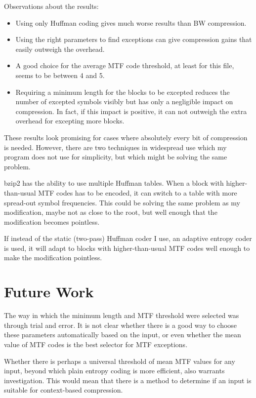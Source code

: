 \documentclass[a4paper]{scrreprt}
\begin{document}
Observations about the results:

\begin{itemize}
  \item Using only Huffman coding gives much worse results than BW compression.
  \item Using the right parameters to find exceptions can give compression gains
  that easily outweigh the overhead.
  \item A good choice for the average MTF code threshold, at least for this
  file, seems to be between 4 and 5.
  \item Requiring a minimum length for the blocks to be excepted reduces the
  number of excepted symbols visibly but has only a negligible impact on
  compression. In fact, if this impact is positive, it can not outweigh the
  extra overhead for excepting more blocks.
\end{itemize}

These results look promising for cases where absolutely every bit of compression
is needed. However, there are two techniques in widespread use which my program
does not use for simplicity, but which might be solving the same problem.

bzip2 has the ability to use multiple Huffman tables. When a block with
higher-than-usual MTF codes has to be encoded, it can switch to a table with
more spread-out symbol frequencies. This could be solving the same problem as my
modification, maybe not as close to the root, but well enough that the
modification becomes pointless.

If instead of the static (two-pass) Huffman coder I use, an adaptive entropy
coder is used, it will adapt to blocks with higher-than-usual MTF codes well
enough to make the modification pointless.
\section{Future Work}

The way in which the minimum length and MTF threshold were selected was through
trial and error. It is not clear whether there is a good way to choose these
parameters automatically based on the input, or even whether the mean value of
MTF codes is the best selector for MTF exceptions.

Whether there is perhaps a universal threshold of mean MTF values for any input,
beyond which plain entropy coding is more efficient, also warrants
investigation. This would mean that there is a method to determine if an input
is suitable for context-based compression.
\end{document}
